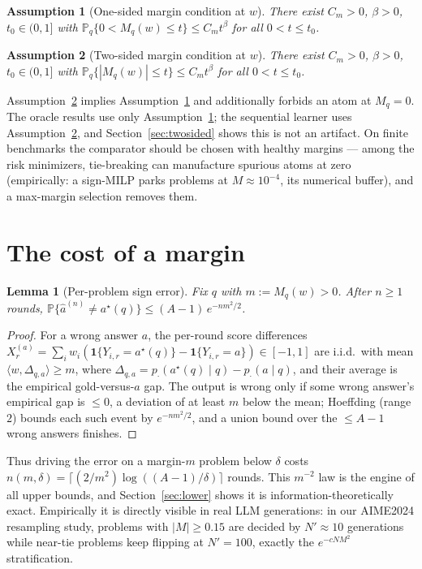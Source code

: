 \documentclass[11pt]{article}
\newtheorem{lemma}{Lemma}
\newtheorem{assumption}{Assumption}
\newcommand{\Pp}{\mathbb P}
\newcommand{\one}{\mathbf 1}
\newcommand{\wfix}{w}
\begin{document}
\begin{assumption}[One-sided margin condition at $\wfix$]
\label{ass:margin}
There exist $C_m>0$, $\beta>0$, $t_0\in(0,1]$ with
$\Pp_q\{0<M_q(\wfix)\le t\}\le C_m t^\beta$ for all $0<t\le t_0$.
\end{assumption}

\begin{assumption}[Two-sided margin condition at $\wfix$]
\label{ass:two-sided}
There exist $C_m>0$, $\beta>0$, $t_0\in(0,1]$ with
$\Pp_q\{|M_q(\wfix)|\le t\}\le C_m t^\beta$ for all $0<t\le t_0$.
\end{assumption}

Assumption~\ref{ass:two-sided} implies Assumption~\ref{ass:margin} and
additionally forbids an atom at $M_q=0$.  The oracle results use only
Assumption~\ref{ass:margin}; the sequential learner uses
Assumption~\ref{ass:two-sided}, and Section~\ref{sec:twosided} shows this is
not an artifact.  On finite benchmarks the comparator should be chosen with
healthy margins --- among the risk minimizers, tie-breaking can manufacture
spurious atoms at zero (empirically: a sign-MILP parks problems at
$M\approx10^{-4}$, its numerical buffer), and a max-margin selection removes
them.

\section{The cost of a margin}

\begin{lemma}[Per-problem sign error]
\label{lem:perproblem}
Fix $q$ with $m:=M_q(\wfix)>0$.  After $n\ge1$ rounds,
$\Pp\{\widehat a^{(n)}\ne a^\star(q)\}\le(A-1)\,e^{-nm^2/2}$.
\end{lemma}

\begin{proof}
For a wrong answer $a$, the per-round score differences
$X^{(a)}_r=\sum_i\wfix_i(\one\{Y_{i,r}=a^\star(q)\}-\one\{Y_{i,r}=a\})\in[-1,1]$
are i.i.d.\ with mean $\langle\wfix,\Delta_{q,a}\rangle\ge m$, where
$\Delta_{q,a}=p_\cdot(a^\star(q)\mid q)-p_\cdot(a\mid q)$, and their average
is the empirical gold-versus-$a$ gap.  The output is wrong only if some
wrong answer's empirical gap is $\le0$, a deviation of at least $m$ below
the mean; Hoeffding (range $2$) bounds each such event by $e^{-nm^2/2}$, and
a union bound over the $\le A-1$ wrong answers finishes.
\end{proof}

Thus driving the error on a margin-$m$ problem below $\delta$ costs
$n(m,\delta)=\lceil(2/m^2)\log((A-1)/\delta)\rceil$ rounds.  This $m^{-2}$
law is the engine of all upper bounds, and Section~\ref{sec:lower} shows it
is information-theoretically exact.  Empirically it is directly visible in
real LLM generations: in our AIME2024 resampling study, problems with
$|M|\ge0.15$ are decided by $N'\approx10$ generations while near-tie
problems keep flipping at $N'=100$, exactly the $e^{-cNM^2}$ stratification.
\end{document}
